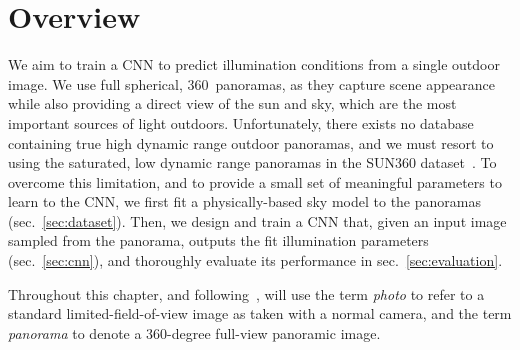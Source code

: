\section{Overview}

We aim to train a CNN to predict illumination conditions from a single outdoor image. We use full spherical, 360\degree ~panoramas, as they capture scene appearance while also providing a direct view of the sun and sky, which are the most important sources of light outdoors. Unfortunately, there exists no database containing true high dynamic range outdoor panoramas, and we must resort to using the saturated, low dynamic range panoramas in the SUN360 dataset~\cite{xiao-cvpr-12}. To overcome this limitation, and to provide a small set of meaningful parameters to learn to the CNN, we first fit a physically-based sky model to the panoramas (sec.~\ref{sec:dataset}). Then, we design and train a CNN that, given an input image sampled from the panorama, outputs the fit illumination parameters (sec.~\ref{sec:cnn}), and thoroughly evaluate its performance in sec.~\ref{sec:evaluation}.

Throughout this chapter, and following~\cite{xiao-cvpr-12}, will use the term \emph{photo} to refer to a standard limited-field-of-view image as taken with a normal camera, and the term \emph{panorama} to denote a 360-degree full-view panoramic image.